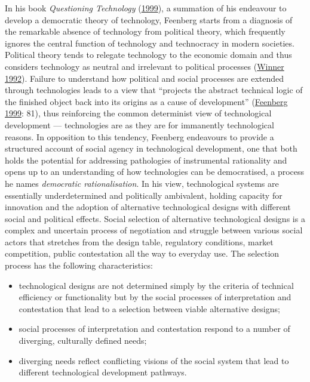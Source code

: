 \documentclass[a4paper, nobind]{templates/ociamthesis}
\providecommand{\tightlist}{%
  \setlength{\itemsep}{0pt}\setlength{\parskip}{0pt}}
\begin{document}
In his book \emph{Questioning Technology} (\protect\hyperlink{ref-feenberg_questioning_1999}{1999}), a summation of his endeavour to develop a democratic theory of technology, Feenberg starts from a diagnosis of the remarkable absence of technology from political theory, which frequently ignores the central function of technology and technocracy in modern societies. Political theory tends to relegate technology to the economic domain and thus considers technology as neutral and irrelevant to political processes (\protect\hyperlink{ref-winner_citizen_1992}{Winner 1992}). Failure to understand how political and social processes are extended through technologies leads to a view that ``projects the abstract technical logic of the finished object back into its origins as a cause of development'' (\protect\hyperlink{ref-feenberg_questioning_1999}{Feenberg 1999}: 81), thus reinforcing the common determinist view of technological development --- technologies are as they are for immanently technological reasons. In opposition to this tendency, Feenberg endeavours to provide a structured account of social agency in technological development, one that both holds the potential for addressing pathologies of instrumental rationality and opens up to an understanding of how technologies can be democratised, a process he names \emph{democratic rationalisation}. In his view, technological systems are essentially underdetermined and politically ambivalent, holding capacity for innovation and the adoption of alternative technological designs with different social and political effects. Social selection of alternative technological designs is a complex and uncertain process of negotiation and struggle between various social actors that stretches from the design table, regulatory conditions, market competition, public contestation all the way to everyday use. The selection process has the following characteristics:

\begin{itemize}
\tightlist
\item
  technological designs are not determined simply by the criteria of technical efficiency or functionality but by the social processes of interpretation and contestation that lead to a selection between viable alternative designs;
\item
  social processes of interpretation and contestation respond to a number of diverging, culturally defined needs;
\item
  diverging needs reflect conflicting visions of the social system that lead to different technological development pathways.
\end{itemize}
\end{document}
